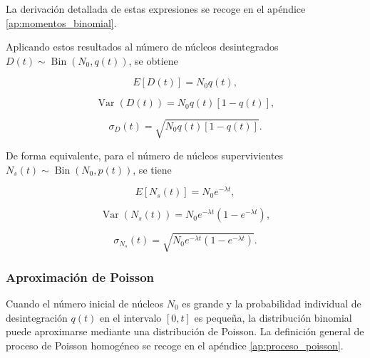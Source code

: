 \documentclass[12pt,a4paper]{article}
\begin{document}
La derivación detallada de estas expresiones se recoge en el apéndice \ref{ap:momentos_binomial}.

Aplicando estos resultados al número de núcleos desintegrados $D(t)\sim \operatorname{Bin}(N_0,q(t))$, se obtiene

\begin{equation}
    E[D(t)]=N_0q(t),
    \label{eq:media_desintegrados_binomial}
\end{equation}

\begin{equation}
    \operatorname{Var}(D(t))=N_0q(t)\left[1-q(t)\right],
    \label{eq:varianza_desintegrados_binomial}
\end{equation}

\begin{equation}
    \sigma_D(t)=\sqrt{N_0q(t)\left[1-q(t)\right]}.
    \label{eq:desviacion_desintegrados_binomial}
\end{equation}

De forma equivalente, para el número de núcleos supervivientes $N_s(t)\sim \operatorname{Bin}(N_0,p(t))$, se tiene

\begin{equation}
    E[N_s(t)]=N_0e^{-\lambda t},
    \label{eq:media_supervivientes_binomial}
\end{equation}

\begin{equation}
    \operatorname{Var}(N_s(t))
    =
    N_0e^{-\lambda t}\left(1-e^{-\lambda t}\right),
    \label{eq:varianza_supervivientes_binomial}
\end{equation}

\begin{equation}
    \sigma_{N_s}(t)
    =
    \sqrt{N_0e^{-\lambda t}\left(1-e^{-\lambda t}\right)}.
    \label{eq:desviacion_supervivientes_binomial}
\end{equation}



\subsubsection{Aproximación de Poisson}

Cuando el número inicial de núcleos $N_0$ es grande y la probabilidad individual de desintegración $q(t)$ en el intervalo $[0,t]$ es pequeña, la distribución binomial puede aproximarse mediante una distribución de Poisson. La definición general de proceso de Poisson homogéneo se recoge en el apéndice \ref{ap:proceso_poisson}.
\end{document}
